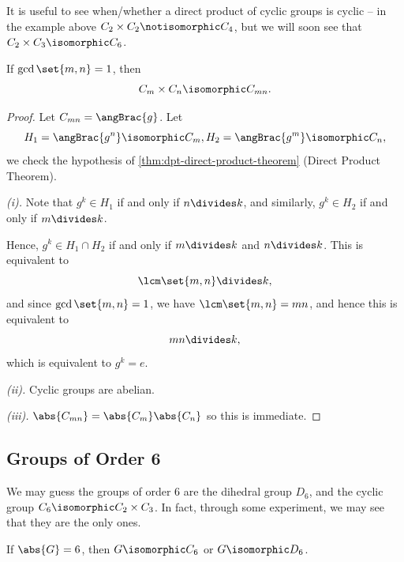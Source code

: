 It is useful to see when/whether a direct product of cyclic groups is cyclic -- in the example above \(C_2 \times C_2 \notisomorphic C_4\), but we will soon see that \(C_2 \times C_3 \isomorphic C_6\).

\begin{theorem}
    \label{thm:crt-chinese-remainder-theorem}%
    If \(\gcd\set{m, n} = 1\), then
    \[
        C_m \times C_n \isomorphic C_{mn}.
    \]
\end{theorem}

\begin{proof}
    Let \(C_{mn} = \angBrac{g}\). Let
    \[
        H_1 = \angBrac{g^n} \isomorphic C_m, H_2 = \angBrac{g^m} \isomorphic C_n,
    \]
    we check the hypothesis of \autoref{thm:dpt-direct-product-theorem} (Direct Product Theorem).

    \emph{(i).} Note that \(g^k \in H_1\) if and only if \(n \divides k\), and similarly, \(g^k \in H_2\) if and only if \(m \divides k\).

    Hence, \(g^k \in H_1 \cap H_2\) if and only if \(m \divides k\) and \(n \divides k\). This is equivalent to
    \[
        \lcm\set{m, n} \divides k,
    \]
    and since \(\gcd\set{m, n} = 1\), we have \(\lcm\set{m, n} = mn\), and hence this is equivalent to
    \[
        mn \divides k,
    \]
    which is equivalent to \(g^k = e\).

    \emph{(ii).} Cyclic groups are abelian.

    \emph{(iii).} \(\abs{C_{mn}} = \abs{C_m} \abs{C_n}\) so this is immediate.
\end{proof}

\subsection{Groups of Order 6}
\label{sec:groups-of-order-6}

We may guess the groups of order \(6\) are the dihedral group \(D_6\), and the cyclic group \(C_6 \isomorphic C_2 \times C_3\). In fact, through some experiment, we may see that they are the only ones.

\begin{lemma}
    \label{lem:groups-of-order-6}%
    If \(\abs{G} = 6\), then \(G \isomorphic C_6\) or \(G \isomorphic D_6\).
\end{lemma}

